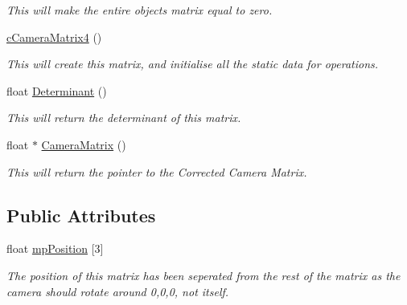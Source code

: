 \begin{DoxyCompactItemize}
\begin{DoxyCompactList}\small\item\em This will make the entire objects matrix equal to zero. \end{DoxyCompactList}\item 
\hypertarget{classc_camera_matrix4_a99df6d312702e5474c5fedad42c95026}{
\hyperlink{classc_camera_matrix4_a99df6d312702e5474c5fedad42c95026}{cCameraMatrix4} ()}
\label{classc_camera_matrix4_a99df6d312702e5474c5fedad42c95026}

\begin{DoxyCompactList}\small\item\em This will create this matrix, and initialise all the static data for operations. \end{DoxyCompactList}\item 
\hypertarget{classc_camera_matrix4_a4f3456fc67fbd37692a8daa9d11d5fc6}{
float \hyperlink{classc_camera_matrix4_a4f3456fc67fbd37692a8daa9d11d5fc6}{Determinant} ()}
\label{classc_camera_matrix4_a4f3456fc67fbd37692a8daa9d11d5fc6}

\begin{DoxyCompactList}\small\item\em This will return the determinant of this matrix. \end{DoxyCompactList}\item 
\hypertarget{classc_camera_matrix4_a8dc77d23773120d4f3161b3ebceddda6}{
float $\ast$ \hyperlink{classc_camera_matrix4_a8dc77d23773120d4f3161b3ebceddda6}{CameraMatrix} ()}
\label{classc_camera_matrix4_a8dc77d23773120d4f3161b3ebceddda6}

\begin{DoxyCompactList}\small\item\em This will return the pointer to the Corrected Camera Matrix. \end{DoxyCompactList}\end{DoxyCompactItemize}
\subsection*{Public Attributes}
\begin{DoxyCompactItemize}
\item 
\hypertarget{classc_camera_matrix4_afb48ac51e480abcece16e031d8bc300a}{
float \hyperlink{classc_camera_matrix4_afb48ac51e480abcece16e031d8bc300a}{mpPosition} \mbox{[}3\mbox{]}}
\label{classc_camera_matrix4_afb48ac51e480abcece16e031d8bc300a}

\begin{DoxyCompactList}\small\item\em The position of this matrix has been seperated from the rest of the matrix as the camera should rotate around 0,0,0, not itself. \end{DoxyCompactList}\end{DoxyCompactItemize}
